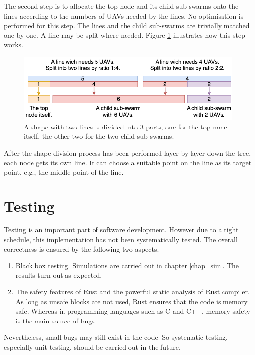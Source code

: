 The second step is to allocate the top node and its child sub-swarms onto the lines
according to the numbers of UAVs needed by the lines.
No optimisation is performed for this step.
The lines and the child sub-swarms are trivially matched one by one.
A line may be split where needed.
Figure \ref{fig:shape_div} illustrates how this step works.

\begin{figure}[htbp]
  \centering
  \includegraphics[width=0.9\linewidth]{rsc/shape_division.png}
  \caption[Shape division.]
  {A shape with two lines is divided into 3 parts,
  one for the top node itself,
  the other two for the two child sub-swarms.}
  \label{fig:shape_div}
\end{figure}

After the shape division process has been performed layer by layer down the tree,
each node gets its own line.
It can choose a suitable point on the line as its target point,
e.g., the middle point of the line.



\section{Testing}

Testing is an important part of software development.
However due to a tight schedule,
this implementation has not been systematically tested.
The overall correctness is ensured by the following two aspects.
\begin{enumerate}
    \item Black box testing. Simulations are carried out in chapter \ref{chap_sim}.
          The results turn out as expected.
    \item The safety features of Rust and the powerful static analysis of Rust compiler.
          As long as unsafe blocks are not used, Rust ensures that the code is memory safe.
          Whereas in programming languages such as C and C++,
          memory safety is the main source of bugs.
\end{enumerate}
Nevertheless, small bugs may still exist in the code.
So systematic testing, especially unit testing, should be carried out in the future.